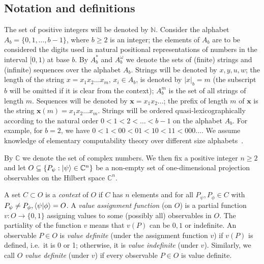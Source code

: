 \documentclass[11pt,a4paper]{article}
\newcommand{\bbbn}{\mathbb{N}}
\begin{document}
\subsection{Notation and definitions}
\label{notat}
The set of positive integers will be denoted by $\bbbn$. Consider the alphabet
$A_{b}=\{0,1,\dots ,b-1\}$, where $b\ge 2$ is an integer; the elements of
$A_b$ are to be considered the digits used in natural positional
representations of numbers in the interval $[0,1)$ at base $b$. By  $A_{b}^{*}$
and  $A_{b}^{\omega}$ we denote the sets of (finite)  strings and (infinite)
sequences over the alphabet $A_{b}$. Strings will be denoted by $x,y,u,w$; the
length of the string $x= x_1x_2\dots x_m$, $x_i\in A_{b}$, is denoted by
$|x|_{b}=m$ (the subscript $b$ will be omitted if it is clear from the
context); $A_{b}^{m}$ is the set of all strings of length $m$.  Sequences will
be denoted by $\mathbf{x}= x_1x_2\dots$; the prefix of length $m$ of
$\mathbf{x}$ is the string $ \mathbf{x}(m)= x_1x_2\dots x_m$.
Strings
will be ordered quasi-lexicographically according to the natural order $0<1<2  < \dots <b-1$ on the
alphabet $A_{b}$. For example, for $b=2$, we have $0<1<00<01<10<11<000 \dots$.
We
assume knowledge of elementary computability theory over different size
alphabets~\cite{calude:02}.

By $\mathbb{C}$ we denote the set of complex numbers.
We then fix a positive integer $n\geq 2$ and let $O \subseteq \{  P_{\psi}:  \ket{\psi} \in \mathbb{C}^{n} \}$ be a non-empty set of one-dimensional projection observables on the Hilbert space $\mathbb{C}^{n}$.


A set $C \subset O$ is a {\it  context} of $O$ if $C$ has $n$ elements  and for all $P_{\psi}, P_{\phi} \in C$ with $P_{\psi} \neq P_{\phi}, \braket{\psi}{\phi} = O$.
A  {\it  value assignment function} (on $O$) is a partial function $v:O\to \{0,1\}$ assigning values to some (possibly all) observables in $O$.  The partiality of the  function $v$ means that $v(P)$ can be $0,1$ or indefinite.
An observable $P \in O$ is  {\it  value definite} (under the assignment function $v$)  if $v(P)$ is defined, i.e.~it is 0 or 1; otherwise, it is  {\it  value indefinite} (under $v$). Similarly, we call $O$  {\it  value definite} (under $v$) if every observable $P \in O$ is value definite.
\end{document}
